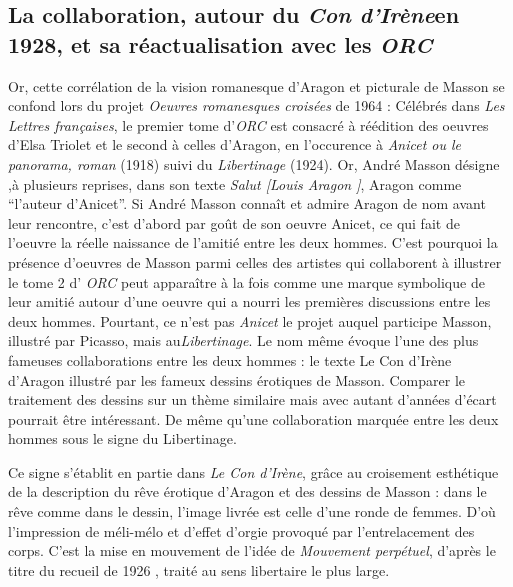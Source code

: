 \subsection{La collaboration, autour du \emph{Con d'Irène}en 1928, et sa réactualisation avec les \emph{ORC}}

Or, cette corrélation de la vision romanesque d’Aragon et picturale de Masson se confond lors du projet \emph{Oeuvres romanesques croisées} de 1964 : Célébrés dans \emph{Les Lettres françaises}, le premier tome d’\emph{ORC} est consacré à réédition des oeuvres d’Elsa Triolet et le second à celles d’Aragon, en l’occurence à \emph{Anicet ou le panorama, roman} (1918)  suivi du  \emph{Libertinage }(1924). Or, André Masson désigne ,à plusieurs reprises, dans son texte \emph{Salut [Louis Aragon ]}, Aragon comme \enquote{l’auteur d’Anicet}. Si André Masson connaît et admire Aragon de nom avant leur rencontre, c’est d’abord par goût de son oeuvre Anicet, ce qui fait de l’oeuvre la réelle naissance de l’amitié entre les deux hommes. C’est pourquoi la présence d’oeuvres de Masson parmi celles des artistes qui collaborent à illustrer le tome 2 d’ \emph{ORC} peut apparaître à la fois comme une marque symbolique de leur amitié autour d’une oeuvre qui a nourri les premières discussions entre les deux hommes. Pourtant, ce n’est pas \emph{Anicet} le projet auquel participe Masson, illustré par Picasso, mais au\emph{Libertinage}. Le nom même évoque l’une des plus fameuses collaborations entre les deux hommes : le texte Le Con d’Irène d’Aragon illustré par les fameux dessins érotiques de Masson. Comparer le traitement des dessins sur un thème similaire mais avec autant d’années d’écart pourrait être intéressant. De même qu’une collaboration marquée entre les deux hommes sous le signe du Libertinage. 

Ce signe s’établit en partie dans \emph{Le Con d’Irène}, grâce au croisement esthétique de la description du rêve érotique d’Aragon et des dessins de Masson : dans le rêve comme dans le dessin, l’image livrée est celle d’une ronde de femmes. D’où l’impression de méli-mélo et d’effet d’orgie provoqué par l’entrelacement des corps. C’est la mise en mouvement de l’idée de \emph{Mouvement perpétuel}, d’après le titre du recueil de  1926 , traité au sens libertaire le plus large.


